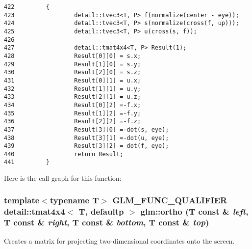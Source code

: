 \begin{Code}\begin{verbatim}422         {
423                 detail::tvec3<T, P> f(normalize(center - eye));
424                 detail::tvec3<T, P> s(normalize(cross(f, up)));
425                 detail::tvec3<T, P> u(cross(s, f));
426 
427                 detail::tmat4x4<T, P> Result(1);
428                 Result[0][0] = s.x;
429                 Result[1][0] = s.y;
430                 Result[2][0] = s.z;
431                 Result[0][1] = u.x;
432                 Result[1][1] = u.y;
433                 Result[2][1] = u.z;
434                 Result[0][2] =-f.x;
435                 Result[1][2] =-f.y;
436                 Result[2][2] =-f.z;
437                 Result[3][0] =-dot(s, eye);
438                 Result[3][1] =-dot(u, eye);
439                 Result[3][2] = dot(f, eye);
440                 return Result;
441         }
\end{verbatim}
\end{Code}




Here is the call graph for this function:\hypertarget{group__gtc__matrix__transform_gdab1dbf2b9ceda856624bafa09b3de07}{
\subsubsection[ortho]{\setlength{\rightskip}{0pt plus 5cm}template$<$typename T$>$ GLM\_\-FUNC\_\-QUALIFIER detail::tmat4x4$<$ T, defaultp $>$ glm::ortho (T const \& {\em left}, \/  T const \& {\em right}, \/  T const \& {\em bottom}, \/  T const \& {\em top})}}
\label{group__gtc__matrix__transform_gdab1dbf2b9ceda856624bafa09b3de07}


Creates a matrix for projecting two-dimensional coordinates onto the screen.

